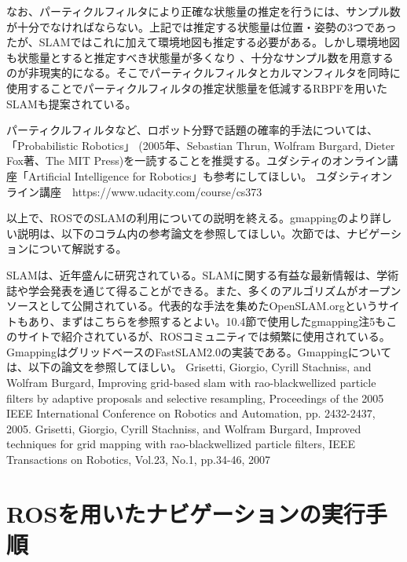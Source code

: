 なお、パーティクルフィルタにより正確な状態量の推定を行うには、サンプル数が十分でなければならない。上記では推定する状態量は位置・姿勢の3つであったが、SLAMではこれに加えて環境地図も推定する必要がある。しかし環境地図も状態量とすると推定すべき状態量が多くなり  、十分なサンプル数を用意するのが非現実的になる。そこでパーティクルフィルタとカルマンフィルタを同時に使用することでパーティクルフィルタの推定状態量を低減するRBPFを用いたSLAMも提案されている。

\begin{exercise}[パーティクルフィルタの解説書]
  パーティクルフィルタなど、ロボット分野で話題の確率的手法については、「Probabilistic Robotics」   (2005年、Sebastian Thrun, Wolfram Burgard, Dieter Fox著、The MIT Press)を一読することを推奨する。ユダシティのオンライン講座「Artificial Intelligence for Robotics」も参考にしてほしい。
  ユダシティオンライン講座　https://www.udacity.com/course/cs373
\end{exercise}

以上で、ROSでのSLAMの利用についての説明を終える。gmappingのより詳しい説明は、以下のコラム内の参考論文を参照してほしい。次節では、ナビゲーションについて解説する。

\begin{exercise}[OpenSLAMとGmapping]
  SLAMは、近年盛んに研究されている。SLAMに関する有益な最新情報は、学術誌や学会発表を通じて得ることができる。また、多くのアルゴリズムがオープンソースとして公開されている。代表的な手法を集めたOpenSLAM.orgというサイトもあり、まずはこちらを参照するとよい。10.4節で使用したgmapping注5もこのサイトで紹介されているが、ROSコミュニティでは頻繁に使用されている。GmappingはグリッドベースのFastSLAM2.0の実装である。Gmappingについては、以下の論文を参照してほしい。
  Grisetti, Giorgio, Cyrill Stachniss, and Wolfram Burgard, Improving grid-based slam with rao-blackwellized particle filters by adaptive proposals and selective resampling, Proceedings of the 2005 IEEE International Conference on Robotics and Automation, pp. 2432-2437, 2005.
  Grisetti, Giorgio, Cyrill Stachniss, and Wolfram Burgard, Improved techniques for grid mapping with rao-blackwellized particle filters, IEEE Transactions on Robotics, Vol.23, No.1, pp.34-46, 2007
\end{exercise}

\section{ROSを用いたナビゲーションの実行手順}

